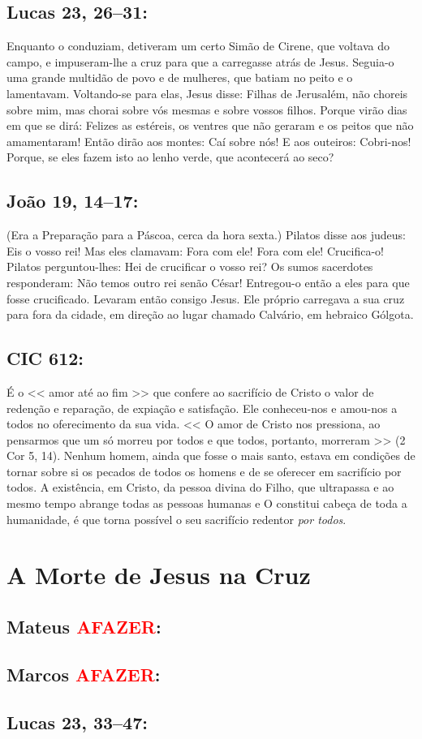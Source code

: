 \documentclass[10pt,a5paper]{book}
\newcommand{\from}[1]{\subsection*{#1}}
\newcommand{\TODO}{\textcolor{red}{\ttfamily AFAZER}}
\begin{document}
\from{Lucas 23, 26--31:}

Enquanto o conduziam, detiveram um certo Simão de Cirene, que voltava do campo, e impuseram-lhe a cruz para que a carregasse atrás de Jesus.
Seguia-o uma grande multidão de povo e de mulheres, que batiam no peito e o lamentavam.
Voltando-se para elas, Jesus disse: Filhas de Jerusalém, não choreis sobre mim, mas chorai sobre vós mesmas e sobre vossos filhos.
Porque virão dias em que se dirá: Felizes as estéreis, os ventres que não geraram e os peitos que não amamentaram!
Então dirão aos montes: Caí sobre nós! E aos outeiros: Cobri-nos!
Porque, se eles fazem isto ao lenho verde, que acontecerá ao seco?

\from{João 19, 14--17:}

(Era a Preparação para a Páscoa, cerca da hora sexta.) Pilatos disse aos judeus: Eis o vosso rei!
Mas eles clamavam: Fora com ele! Fora com ele! Crucifica-o! Pilatos perguntou-lhes: Hei de crucificar o vosso rei? Os sumos sacerdotes responderam: Não temos outro rei senão César!
Entregou-o então a eles para que fosse crucificado.
Levaram então consigo Jesus. Ele próprio carregava a sua cruz para fora da cidade, em direção ao lugar chamado Calvário, em hebraico Gólgota.

\from{CIC 612:}

É o << amor até ao fim >> que confere ao sacrifício de Cristo o valor de redenção e reparação, de expiação e satisfação.
Ele conheceu-nos e amou-nos a todos no oferecimento da sua vida.
<< O amor de Cristo nos pressiona, ao pensarmos que um só morreu por todos e que todos, portanto, morreram >> (2 Cor 5, 14).
Nenhum homem, ainda que fosse o mais santo, estava em condições de tornar sobre si os pecados de todos os homens e de se oferecer em sacrifício por todos.
A existência, em Cristo, da pessoa divina do Filho, que ultrapassa e ao mesmo tempo abrange todas as pessoas humanas e O constitui cabeça de toda a humanidade, é que torna possível o seu sacrifício redentor \emph{por todos}.


\section{A Morte de Jesus na Cruz}

\from{Mateus \TODO:}

\from{Marcos \TODO:}

\from{Lucas 23, 33--47:}
\end{document}
